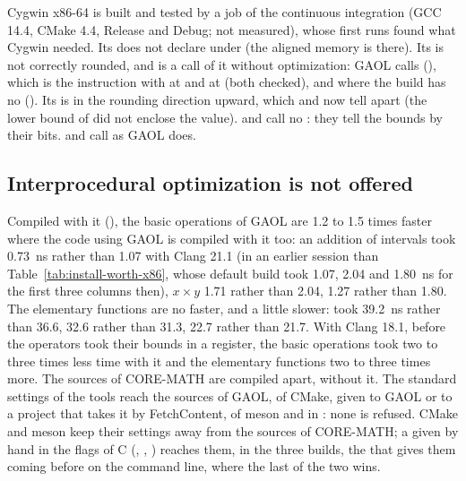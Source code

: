 \begin{Rem}
Cygwin x86-64 is built and tested by a job of the continuous integration (GCC
14.4, CMake 4.4, Release and Debug; not measured), whose first runs found what Cygwin
needed.\newinvfive{} Its  does not declare
 under  (the aligned memory is
 there). Its  is not correctly rounded, and
 is a call of it without optimization: GAOL calls
 (), which is the instruction with
 at  and at  (both checked), and
 where the build has no  (). Its
 is  in the rounding
direction upward, which  and  now
tell apart (the lower bound of  did not enclose the value).
 and  call no : they
tell the bounds by their bits.
 and  call
 as GAOL does.
\end{Rem}

\subsection{Interprocedural optimization is not offered}
\label{sec:install-ipo}
%

Compiled with it (), the basic operations of GAOL are 1.2 to
1.5 times faster where the code using GAOL is compiled with it too: an addition of intervals took 0.73~ns rather than 1.07 with Clang 21.1 (in an earlier session than Table~\ref{tab:install-worth-x86}, whose default build took 1.07, 2.04 and 1.80~ns for the first three columns then),
$x \times y$ 1.71 rather than 2.04,  1.27 rather than 1.80. The
elementary functions are no faster, and a little slower:  took
39.2~ns rather than 36.6,  32.6 rather than 31.3,  22.7
rather than 21.7. With Clang 18.1, before the operators took their bounds in
a register, the basic operations took two to three times less time with it
and the elementary functions two to three times more. The sources of
CORE-MATH are compiled apart, without it. The standard settings
of the tools reach the sources of GAOL, 
of CMake, given to GAOL or to a project that takes it by FetchContent,
 of meson and  in : none is
refused. CMake and meson keep their settings away from the sources of
CORE-MATH; a  given by hand in the flags of C
(, , ) reaches them, in the
three builds, the  that  gives them coming
before  on the command line, where the last of the two wins.

